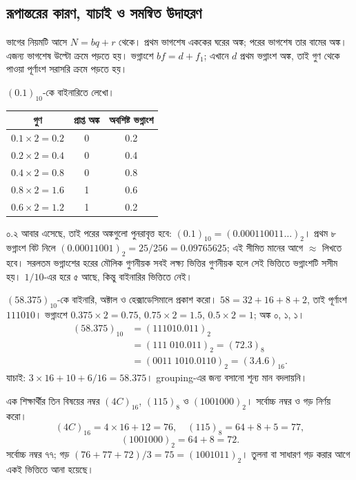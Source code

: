 \subsection{রূপান্তরের কারণ, যাচাই ও সমন্বিত উদাহরণ}
ভাগের নিয়মটি আসে $N=bq+r$ থেকে। প্রথম ভাগশেষ এককের ঘরের অঙ্ক; পরের ভাগশেষ তার বামের অঙ্ক। এজন্য ভাগশেষ উল্টো ক্রমে পড়তে হয়। ভগ্নাংশে $bf=d+f_1$; এখানে $d$ প্রথম ভগ্নাংশ অঙ্ক, তাই গুণ থেকে পাওয়া পূর্ণাংশ সরাসরি ক্রমে পড়তে হয়।

$(0.1)_{10}$-কে বাইনারিতে লেখো।
\chThreeAnswer
\begin{center}\begin{tabular}{|c|c|c|}\hline
গুণ & প্রাপ্ত অঙ্ক & অবশিষ্ট ভগ্নাংশ\\\hline
$0.1\times2=0.2$ & 0 & 0.2\\\hline
$0.2\times2=0.4$ & 0 & 0.4\\\hline
$0.4\times2=0.8$ & 0 & 0.8\\\hline
$0.8\times2=1.6$ & 1 & 0.6\\\hline
$0.6\times2=1.2$ & 1 & 0.2\\\hline
\end{tabular}\end{center}
০.২ আবার এসেছে, তাই পরের অঙ্কগুলো পুনরাবৃত্ত হবে: $(0.1)_{10}=(0.000110011\ldots)_2$। প্রথম ৮ ভগ্নাংশ বিট নিলে $(0.00011001)_2=25/256=0.09765625$; এই সীমিত মানের আগে $\approx$ লিখতে হবে। সরলতম ভগ্নাংশের হরের মৌলিক গুণনীয়ক সবই লক্ষ্য ভিত্তির গুণনীয়ক হলে সেই ভিত্তিতে ভগ্নাংশটি সসীম হয়। $1/10$-এর হরে ৫ আছে, কিন্তু বাইনারির ভিত্তিতে নেই।

$(58.375)_{10}$-কে বাইনারি, অক্টাল ও হেক্সাডেসিমালে প্রকাশ করো।
\chThreeAnswer $58=32+16+8+2$, তাই পূর্ণাংশ $111010$। ভগ্নাংশে $0.375\times2=0.75$, $0.75\times2=1.5$, $0.5\times2=1$; অঙ্ক ০, ১, ১।
\[\begin{aligned}
(58.375)_{10}&=(111010.011)_2\\
&=(111\;010.011)_2=(72.3)_8\\
&=(0011\;1010.0110)_2=(3A.6)_{16}.
\end{aligned}\]
যাচাই: $3\times16+10+6/16=58.375$। grouping-এর জন্য বসানো শূন্য মান বদলায়নি।

এক শিক্ষার্থীর তিন বিষয়ের নম্বর $(4C)_{16}$, $(115)_8$ ও $(1001000)_2$। সর্বোচ্চ নম্বর ও গড় নির্ণয় করো।
\chThreeAnswer
\[(4C)_{16}=4\times16+12=76,\quad(115)_8=64+8+5=77,\]
\[(1001000)_2=64+8=72.\]
সর্বোচ্চ নম্বর ৭৭; গড় $(76+77+72)/3=75=(1001011)_2$। তুলনা বা সাধারণ গড় করার আগে একই ভিত্তিতে আনা হয়েছে।

